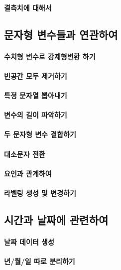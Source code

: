 \documentclass{report}
\begin{document}
\paragraph{결측치에 대해서}

\subsection{문자형 변수들과 연관하여}

\paragraph{수치형 변수로 강제형변환 하기}
\paragraph{빈공간 모두 제거하기}
\paragraph{특정 문자열 뽑아내기}
\paragraph{변수의 길이 파악하기}
\paragraph{두 문자형 변수 결합하기}
\paragraph{대소문자 전환} 
\paragraph{요인과 관계하여}
\paragraph{라벨링 생성 및 변경하기}


\subsection{시간과 날짜에 관련하여}

\paragraph{날짜 데이터 생성}
\paragraph{년/월/일 따로 분리하기}
\end{document}

